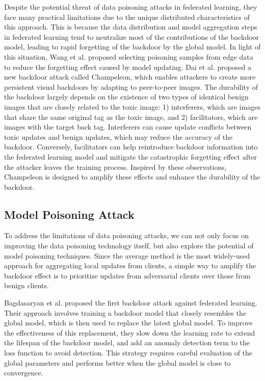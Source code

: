 \documentclass[conference]{IEEEtran}
\begin{document}
Despite the potential threat of data poisoning attacks in federated learning,
they face many practical limitations due to the unique distributed characteristics of this approach\cite{b25}.
This is because the data distribution and model aggregation steps in federated learning tend to neutralize
most of the contributions of the backdoor model, leading to rapid forgetting of the backdoor by the global model.
In light of this situation, Wang et al.\cite{b25} proposed selecting poisoning samples from edge data to reduce the
forgetting effect caused by model updating. Dai et al.\cite{b64} proposed a new backdoor attack called Champeleon,
which enables attackers to create more persistent visual backdoors by adapting
to peer-to-peer images. The durability of the backdoor largely depends
on the existence of two types of identical benign images that are closely
related to the toxic image: 1) interferers, which are images that share
the same original tag as the toxic image, and 2) facilitators, which are
images with the target back tag. Interferers can cause update conflicts
between toxic updates and benign updates, which may reduce the accuracy of
the backdoor. Conversely, facilitators can help reintroduce backdoor
information into the federated learning model and mitigate the catastrophic
forgetting effect after the attacker leaves the training process. Inspired by
these observations, Champeleon is designed to amplify these effects and enhance
the durability of the backdoor.

\subsection{Model Poisoning Attack}
To address the limitations of data poisoning attacks, we can not only focus on
improving the data poisoning technology itself, but also explore the potential
of model poisoning techniques. Since the average method is the most widely-used
approach for aggregating local updates from clients, a simple way to amplify
the backdoor effect is to prioritize updates from adversarial clients over
those from benign clients.

Bagdasaryan et al.\cite{b24} proposed the first backdoor attack against federated learning.
Their approach involves training a backdoor model that closely resembles the global
model, which is then used to replace the latest global model.
To improve the effectiveness of this replacement, they slow down
the learning rate to extend the lifespan of the backdoor model, and add an
anomaly detection term to the loss function to avoid detection. This
strategy requires careful evaluation of the global parameters and performs
better when the global model is close to convergence.
\end{document}
